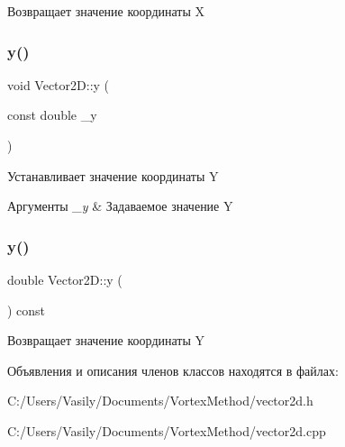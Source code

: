 Возвращает значение координаты X \mbox{\label{class_vector2_d_a544f0184543c286f599630ad9d390ce7}} 
\subsubsection{\texorpdfstring{y()}{y()}\hspace{0.1cm}{\footnotesize\ttfamily [1/2]}}
{\footnotesize\ttfamily void Vector2\+D\+::y (\begin{DoxyParamCaption}\item[{const double}]{\+\_\+y }\end{DoxyParamCaption})}

Устанавливает значение координаты Y 
\begin{DoxyParams}{Аргументы}
{\em \+\_\+y} & Задаваемое значение Y \\
\hline
\end{DoxyParams}
\mbox{\label{class_vector2_d_a4989f56e0e142a183ba3b9127f2fa794}} 
\subsubsection{\texorpdfstring{y()}{y()}\hspace{0.1cm}{\footnotesize\ttfamily [2/2]}}
{\footnotesize\ttfamily double Vector2\+D\+::y (\begin{DoxyParamCaption}{ }\end{DoxyParamCaption}) const}

Возвращает значение координаты Y 

Объявления и описания членов классов находятся в файлах\+:\begin{DoxyCompactItemize}
\item 
C\+:/\+Users/\+Vasily/\+Documents/\+Vortex\+Method/vector2d.\+h\item 
C\+:/\+Users/\+Vasily/\+Documents/\+Vortex\+Method/vector2d.\+cpp\end{DoxyCompactItemize}
